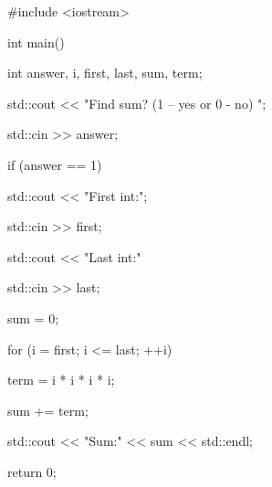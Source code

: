 
\begin{console}

#include <iostream>



int main()

{   

     int answer, i, first, last, sum, term;

     std::cout << "Find sum? (1 -- yes or 0 - no) ";

     std::cin >> answer;

     

     if (answer == 1)

     {    

          std::cout << "First int:";

          std::cin >> first;

          std::cout << "Last int:"

          std::cin >> last;



          sum = 0;

          for (i = first; i <= last; ++i)

          {    

               term = i * i * i * i;

               sum += term;

          }

          std::cout << "Sum:" << sum << std::endl;

     }



     return 0;

}

\end{console}



